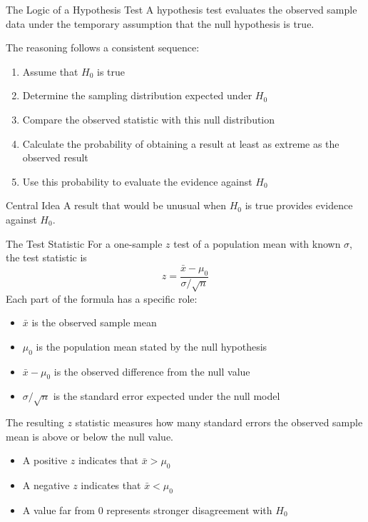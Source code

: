 \documentclass[aspectratio=169]{beamer}
\begin{document}
\begin{frame}{The Logic of a Hypothesis Test}
A hypothesis test evaluates the observed sample data under the temporary assumption that the null hypothesis is true.

\vspace{0.2cm}
The reasoning follows a consistent sequence:
\begin{enumerate}  
	\item Assume that $H_0$ is true
  	\item Determine the sampling distribution expected under $H_0$
  	\item Compare the observed statistic with this null distribution
	 \item Calculate the probability of obtaining a result at least as extreme as the observed result
  	\item Use this probability to evaluate the evidence against $H_0$
\end{enumerate}

\begin{block}{Central Idea}
A result that would be unusual when $H_0$ is true provides evidence against $H_0$.
\end{block}
\end{frame}

\begin{frame}{The Test Statistic}
For a one-sample $z$ test of a population mean with known $\sigma$, the test statistic is
$$z=\frac{\bar{x}-\mu_0}{\sigma/\sqrt{n}}$$
Each part of the formula has a specific role:
\begin{itemize}
	\item $\bar{x}$ is the observed sample mean
	\item $\mu_0$ is the population mean stated by the null hypothesis
	\item $\bar{x}-\mu_0$ is the observed difference from the null value
\item $\sigma/\sqrt{n}$ is the standard error expected under the null model
\end{itemize}

\vspace{0.15cm}
The resulting $z$ statistic measures how many standard errors the observed sample mean is above or below the null value.
\begin{itemize}
	\item A positive $z$ indicates that $\bar{x}>\mu_0$
	\item A negative $z$ indicates that $\bar{x}<\mu_0$
	\item A value far from $0$ represents stronger disagreement with $H_0$
\end{itemize}
\end{frame}
\end{document}
